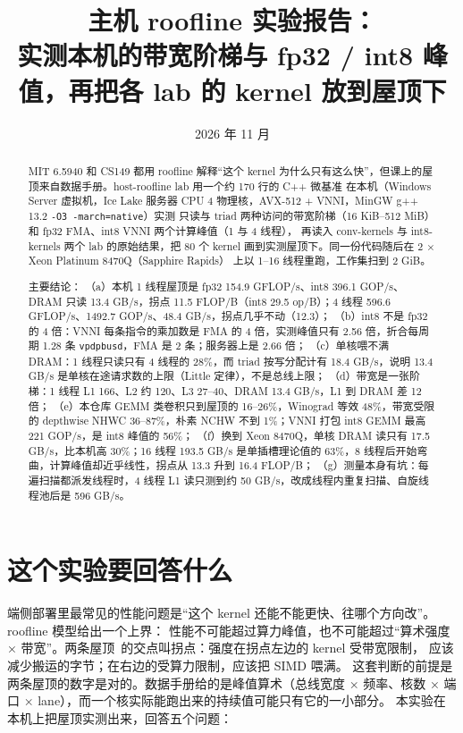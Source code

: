 \documentclass[11pt,a4paper]{ctexart}
\title{主机 roofline 实验报告：\\实测本机的带宽阶梯与 fp32 / int8 峰值，再把各 lab 的 kernel 放到屋顶下}
\author{\authorline}
\date{2026 年 11 月}
\begin{document}
\maketitle

\begin{abstract}
MIT 6.5940 和 CS149 都用 roofline 解释“这个 kernel 为什么只有这么快”，但课上的屋顶来自数据手册。host-roofline lab 用一个约 170 行的 C++ 微基准
在本机（Windows Server 虚拟机，Ice Lake 服务器 CPU 4 物理核，AVX-512 + VNNI，MinGW g++ 13.2 \texttt{-O3 -march=native}）实测
只读与 triad 两种访问的带宽阶梯（16 KiB--512 MiB）和 fp32 FMA、int8 VNNI 两个计算峰值（1 与 4 线程），
再读入 conv-kernels 与 int8-kernels 两个 lab 的原始结果，把 80 个 kernel 画到实测屋顶下。同一份代码随后在 2 × Xeon Platinum 8470Q（Sapphire Rapids）
上以 1--16 线程重跑，工作集扫到 2 GiB。

主要结论：
（a）本机 1 线程屋顶是 fp32 154.9 GFLOP/s、int8 396.1 GOP/s、DRAM 只读 13.4 GB/s，拐点 11.5 FLOP/B（int8 29.5 op/B）；4 线程 596.6 GFLOP/s、1492.7 GOP/s、48.4 GB/s，拐点几乎不动（12.3）；
（b）int8 不是 fp32 的 4 倍：VNNI 每条指令的乘加数是 FMA 的 4 倍，实测峰值只有 2.56 倍，折合每周期 1.28 条 \texttt{vpdpbusd}，FMA 是 2 条；服务器上是 2.66 倍；
（c）单核喂不满 DRAM：1 线程只读只有 4 线程的 28\%，而 triad 按写分配计有 18.4 GB/s，说明 13.4 GB/s 是单核在途请求数的上限（Little 定律），不是总线上限；
（d）带宽是一张阶梯：1 线程 L1 166、L2 约 120、L3 27--40、DRAM 13.4 GB/s，L1 到 DRAM 差 12 倍；
（e）本仓库 GEMM 类卷积只到屋顶的 16--26\%，Winograd 等效 48\%，带宽受限的 depthwise NHWC 36--87\%，朴素 NCHW 不到 1\%；VNNI 打包 int8 GEMM 最高 221 GOP/s，是 int8 峰值的 56\%；
（f）换到 Xeon 8470Q，单核 DRAM 读只有 17.5 GB/s，比本机高 30\%；16 线程 193.5 GB/s 是单插槽理论值的 63\%，8 线程后开始弯曲，计算峰值却近乎线性，拐点从 13.3 升到 16.4 FLOP/B；
（g）测量本身有坑：每遍扫描都派发线程时，4 线程 L1 读只测到约 50 GB/s，改成线程内重复扫描、自旋线程池后是 596 GB/s。
\end{abstract}

\tableofcontents
\newpage

\section{这个实验要回答什么}\label{sec:questions}

端侧部署里最常见的性能问题是“这个 kernel 还能不能更快、往哪个方向改”。roofline 模型给出一个上界：
性能不可能超过算力峰值，也不可能超过“算术强度 × 带宽”。两条屋顶~\cite{roofline}的交点叫拐点：强度在拐点左边的 kernel 受带宽限制，
应该减少搬运的字节；在右边的受算力限制，应该把 SIMD 喂满。
这套判断的前提是两条屋顶的数字是对的。数据手册给的是峰值算术（总线宽度 × 频率、核数 × 端口 × lane），而一个核实际能跑出来的持续值可能只有它的一小部分。
本实验在本机上把屋顶实测出来，回答五个问题：
\end{document}
